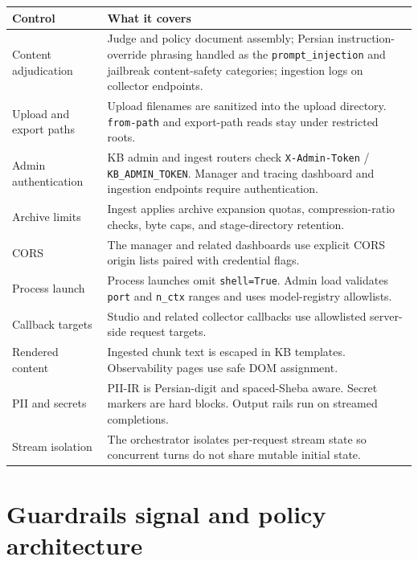\begin{longtable}[]{@{}
  >{\raggedright\arraybackslash}p{}
  >{\raggedright\arraybackslash}p{}@{}}
\toprule\noalign{}
Control & What it covers \\
\midrule\noalign{}
\endhead
\bottomrule\noalign{}
\endlastfoot
Content adjudication & Judge and policy document assembly; Persian instruction-override phrasing handled as the \texttt{prompt\_injection} and jailbreak content-safety categories; ingestion logs on collector endpoints. \\
Upload and export paths & Upload filenames are sanitized into the upload directory. \texttt{from-path} and export-path reads stay under restricted roots. \\
Admin authentication & KB admin and ingest routers check \texttt{X-Admin-Token} / \texttt{KB\_ADMIN\_TOKEN}. Manager and tracing dashboard and ingestion endpoints require authentication. \\
Archive limits & Ingest applies archive expansion quotas, compression-ratio checks, byte caps, and stage-directory retention. \\
CORS & The manager and related dashboards use explicit CORS origin lists paired with credential flags. \\
Process launch & Process launches omit \texttt{shell=True}. Admin load validates \texttt{port} and \texttt{n\_ctx} ranges and uses model-registry allowlists. \\
Callback targets & Studio and related collector callbacks use allowlisted server-side request targets. \\
Rendered content & Ingested chunk text is escaped in KB templates. Observability pages use safe DOM assignment. \\
PII and secrets & PII-IR is Persian-digit and spaced-Sheba aware. Secret markers are hard blocks. Output rails run on streamed completions. \\
Stream isolation & The orchestrator isolates per-request stream state so concurrent turns do not share mutable initial state. \\
\end{longtable}

\section{Guardrails signal and policy architecture}\label{guardrails-signal-and-policy-architecture}

